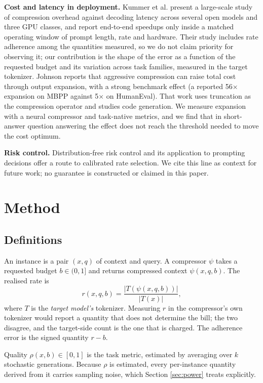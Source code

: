 \documentclass[conference]{IEEEtran}
\begin{document}
\textbf{Cost and latency in deployment.} Kummer et al. \cite{kummer2026wild}
present a large-scale study of compression overhead against decoding latency
across several open models and three GPU classes, and report end-to-end
speedups only inside a matched operating window of prompt length, rate and
hardware. Their study includes rate adherence among the quantities measured,
so we do not claim priority for observing it; our contribution is the shape of
the error as a function of the requested budget and its variation across task
families, measured in the target tokenizer. Johnson
\cite{johnson2026production,johnson2026method} reports that aggressive
compression can raise total cost through output expansion, with a strong
benchmark effect (a reported 56$\times$ expansion on MBPP against 5$\times$ on
HumanEval). That work uses truncation as the compression operator and studies
code generation. We measure expansion with a neural compressor and task-native
metrics, and we find that in short-answer question answering the effect does
not reach the threshold needed to move the cost optimum.

\textbf{Risk control.} Distribution-free risk control
\cite{angelopoulos2022crc,angelopoulos2021ltt} and its application to
prompting decisions \cite{zollo2023prc} offer a route to calibrated rate
selection. We cite this line as context for future work; no guarantee is
constructed or claimed in this paper.

\section{Method}

\subsection{Definitions}

An instance is a pair $(x,q)$ of context and query. A compressor $\psi$ takes
a requested budget $b \in (0,1]$ and returns compressed context
$\psi(x,q,b)$. The realised rate is
\begin{equation}
r(x,q,b) = \frac{|T(\psi(x,q,b))|}{|T(x)|},
\end{equation}
where $T$ is the \emph{target model's} tokenizer. Measuring $r$ in the
compressor's own tokenizer would report a quantity that does not determine the
bill; the two disagree, and the target-side count is the one that is charged.
The adherence error is the signed quantity $r - b$.

Quality $\rho(x,b) \in [0,1]$ is the task metric, estimated by averaging over
$k$ stochastic generations. Because $\rho$ is estimated, every per-instance
quantity derived from it carries sampling noise, which Section
\ref{sec:power} treats explicitly.
\end{document}
